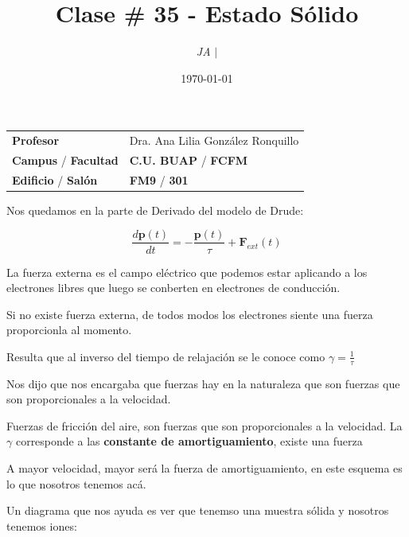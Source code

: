 \documentclass{article}
\title{Clase \# 35 - Estado Sólido}
\author{\emph{JA} $\boldsymbol{\mid}$}
\date{\today}
\begin{document}
\maketitle



\begin{mybox}
\noindent\begin{tabular}{@{}ll}
	{\bfseries{Profesor}} & Dra. Ana Lilia González Ronquillo\\
	\textcolor{prussianblue}{\bfseries{Campus}} / \textcolor{trueblue}{\bfseries{Facultad}}  & \textcolor{prussianblue}{\bfseries{C.U. BUAP}} /  \textcolor{trueblue}{\bfseries{FCFM}} \\
	\textcolor{prussianblue}{\bfseries{Edificio}} /  \textcolor{trueblue}{\bfseries{Salón}}    & 	\textcolor{prussianblue}{\bfseries{FM9}} /  \textcolor{trueblue}{\bfseries{301}}   
\end{tabular} 
\end{mybox} \vspace{1cm}

\tableofcontents

\vspace{2cm}


Nos quedamos en la parte de Derivado del modelo de Drude:

\[  \frac{d \boldsymbol{p}(t) }{dt} = - \frac{ \boldsymbol{p}(t) }{\tau} + \boldsymbol{F}_{ext}(t)  \]

La fuerza externa es el campo eléctrico que podemos estar aplicando a los electrones libres que luego se conberten en electrones de conducción.

Si no existe fuerza externa, de todos modos los electrones siente una fuerza proporcionla al momento.

Resulta que al inverso del tiempo de relajación se le conoce como $\gamma = \frac{1}{\tau}$

Nos dijo que nos encargaba que fuerzas hay en la naturaleza que son fuerzas que son proporcionales a la velocidad.  


Fuerzas de fricción del aire, son fuerzas que son proporcionales a la velocidad. La $\gamma$ corresponde a las \textbf{constante de amortiguamiento}, existe una fuerza 

A mayor velocidad, mayor será la fuerza de amortiguamiento, en este esquema es lo que nosotros tenemos acá. 

Un diagrama que nos ayuda es ver que tenemso una muestra sólida y nosotros tenemos iones:
\end{document}
